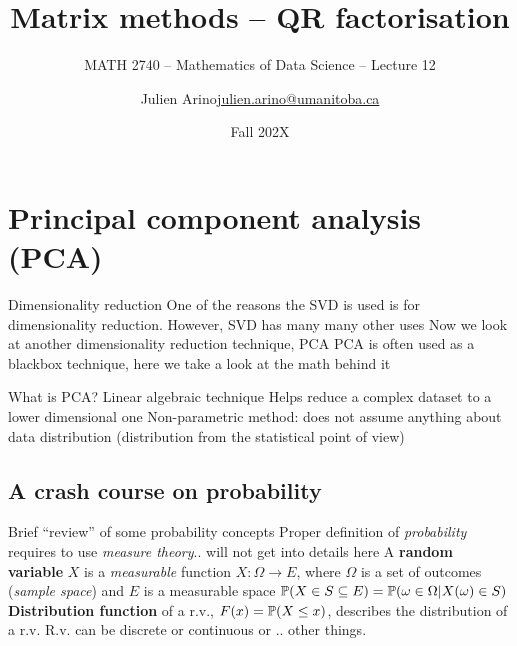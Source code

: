 \documentclass[aspectratio=169]{beamer}\usepackage[]{graphicx}\usepackage[]{xcolor}
\subtitle{MATH 2740 -- Mathematics of Data Science -- Lecture 12}
\author{\texorpdfstring{Julien Arino\newline\url{julien.arino@umanitoba.ca}}{Julien Arino}}
\institute{Department of Mathematics @ University of Manitoba}
\date{Fall 202X}
\title{Matrix methods -- QR factorisation}
\begin{document}




\section{Principal component analysis (PCA)}


\begin{frame}{Dimensionality reduction}
One of the reasons the SVD is used is for dimensionality reduction. However, SVD has many many other uses
\vfill
Now we look at another dimensionality reduction technique, PCA
\vfill
PCA is often used as a blackbox technique, here we take a look at the math behind it
\end{frame}


\begin{frame}{What is PCA?}
Linear algebraic technique 
\vfill
Helps reduce a complex dataset to a lower dimensional one
\vfill
Non-parametric method: does not assume anything about data distribution (distribution from the statistical point of view)
\end{frame}

\subsection{A crash course on probability}


\begin{frame}{Brief ``review'' of some probability concepts}
Proper definition of \emph{probability} requires to use \emph{measure theory}.. will not get into details here
\vfill
A \textbf{random variable} $X$ is a \emph{measurable} function $X:\Omega\to E$, where $\Omega$ is a set of outcomes (\emph{sample space}) and $E$ is a measurable space
\vfill
$\mathbb{P}(X\in S\subseteq E) = \mathbb{P}(\omega\in\Omega|X(\omega)\in S)$
\vfill
\textbf{Distribution function} of a r.v., $F(x)=\mathbb{P}(X\leq x)$, describes the distribution of a r.v.
\vfill
R.v. can be discrete or continuous or .. other things. 
\end{frame}
\end{document}
